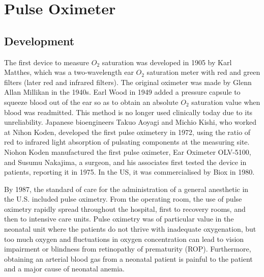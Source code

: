 \documentclass[11pt]{article}
\begin{document}
\pagebreak

\section*{\centering Pulse Oximeter}

\subsection*{Development}

The first device to measure $O_2$ saturation was developed in 1905 by Karl Matthes, which was a two-wavelength ear $O_2$ saturation meter with red and green filters (later red and infrared filters). The original oximeter was made by Glenn Allan Millikan in the 1940s. Earl Wood in 1949 added a pressure capsule to squeeze blood out of the ear so as to obtain an absolute $O_2$ saturation value when blood was readmitted. This method is no longer used clinically today due to its unreliability. Japanese bioengineers Takuo Aoyagi and Michio Kishi, who worked at Nihon Koden, developed the first pulse oximetery in 1972, using the ratio of red to infrared light absorption of pulsating components at the measuring site. Niohon Koden manufactured the first pulse oximeter, Ear Oximeter OLV-5100, and Susumu Nakajima, a surgeon, and his associates first tested the device in patients, reporting it in 1975. In the US, it was commercialised by Biox in 1980. 

By 1987, the standard of care for the administration of a general anesthetic in the U.S. included pulse oximetry. From the operating room, the use of pulse oximetry rapidly spread throughout the hospital, first to recovery rooms, and then to intensive care units. Pulse oximetry was of particular value in the neonatal unit where the patients do not thrive with inadequate oxygenation, but too much oxygen and fluctuations in oxygen concentration can lead to vision impairment or blindness from retinopathy of prematurity (ROP). Furthermore, obtaining an arterial blood gas from a neonatal patient is painful to the patient and a major cause of neonatal anemia.
\end{document}
